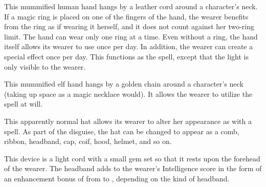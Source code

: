  This mummified human hand hangs by a leather cord around a character's neck. If a magic ring is placed on one of the fingers of the hand, the wearer benefits from the ring as if wearing it herself, and it does not count against her two-ring limit. The hand can wear only one ring at a time. Even without a ring, the hand itself allows its wearer to use  once per day. In addition, the wearer can create a special  effect once per day. This functions as the  spell, except that the light is only visible to the wearer.

 This mummified elf hand hangs by a golden chain around a character's neck (taking up space as a magic necklace would). It allows the wearer to utilize the spell  at will.

 This apparently normal hat allows its wearer to alter her appearance as with a  spell. As part of the disguise, the hat can be changed to appear as a comb, ribbon, headband, cap, coif, hood, helmet, and so on.

 This device is a light cord with a small gem set so that it rests upon the forehead of the wearer. The headband adds to the wearer's Intelligence score in the form of an enhancement bonus of from  to , depending on the kind of headband.


